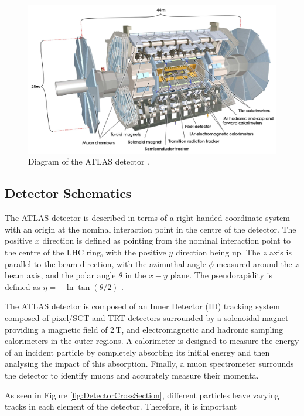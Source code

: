 \documentclass{article}
\begin{document}
\begin{figure}[h]
    \centering
    \includegraphics[scale=0.075]{images/AtlasDetector.jpg}
    \caption{ Diagram of the ATLAS detector \cite{ATLASReview}. \label{fig:ATLASDiagram} }
\end{figure}

\subsection{Detector Schematics}
\label{sec:ATLAS_DetectorSchematics}

The ATLAS detector is described in terms of a right handed coordinate system with an origin at the nominal interaction point in the centre of the detector. The positive $x$ direction is defined as pointing from the nominal interaction point to the centre of the LHC ring, with the positive $y$ direction being up. The $z$ axis is parallel to the beam direction, with the azimuthal angle $\phi$ measured around the $z$ beam axis, and the polar angle $\theta$ in the $x-y$ plane. The pseudorapidity is defined as $\eta = -\ln\tan(\theta/2)$ \cite{ATLASReview}.

The ATLAS detector is composed of an Inner Detector (ID) tracking system composed of pixel/SCT and TRT detectors surrounded by a solenoidal magnet providing a magnetic field of $2\,$T, and electromagnetic and hadronic sampling calorimeters in the outer regions. A calorimeter is designed to measure the energy of an incident particle by completely absorbing its initial energy and then analysing the impact of this absorption. Finally, a muon spectrometer surrounds the detector to identify muons and accurately measure their momenta. 

As seen in Figure \ref{fig:DetectorCrossSection}, different particles leave varying tracks in each element of the detector. Therefore, it is important
\end{document}
